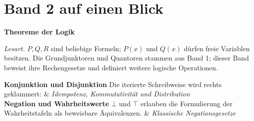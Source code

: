 \chapter[Band 2: Theoreme der Logik]{Band 2 auf einen Blick}
\noindent\textbf{Theoreme der Logik}\par\medskip
\noindent\emph{Lesart.} \(P,Q,R\) sind beliebige Formeln;
\(P(x)\) und \(Q(x)\) dürfen freie Variablen besitzen. Die
Grundjunktoren und Quantoren stammen aus Band 1; dieser Band beweist
ihre Rechengesetze und definiert weitere logische Operationen.
\begin{BandUebersicht}
\textbf{Konjunktion und Disjunktion}
Die iterierte Schreibweise wird rechts geklammert:
&
\textit{Idempotenz, Kommutativität und Distribution}
\\
\addlinespace[.8ex]
\textbf{Negation und Wahrheitswerte}
\(\bot\) und \(\top\) erlauben die Formulierung der Wahrheitstafeln
als beweisbare Äquivalenzen.
\UebQuellen{\FormulaRefAuto{\top \coloneqq \neg\bot}[def]}
&
\textit{Klassische Negationsgesetze}
\end{BandUebersicht}

